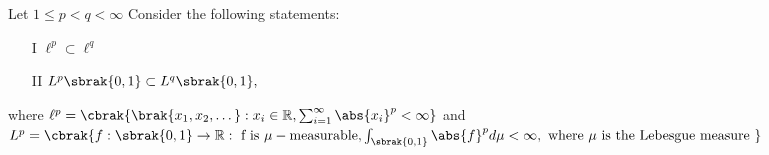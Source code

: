 \bigskip
\item Let $1 \leq p < q < \infty$  Consider the following statements:
\begin{itemize}
    \item [I] $\ell^{p} \subset \ell^{q}$
    \item [II] $L^{p}\sbrak{0,1} \subset L^{q}\sbrak{0,1},$
\end{itemize}
where $\ell^{p} = \cbrak{\brak{x_{1}, x_{2}, \dots} : x_{i} \in \mathbb{R}, \sum_{i=1}^{\infty} \abs{x_i}^{p} < \infty}$ and\\
{\small $L^{p}=\cbrak{f:\sbrak{0,1}\to\mathbb{R}:\text{ f is }\mu-\text{measurable},\int_{\sbrak{0,1}}\abs{f}^{p}d\mu<\infty, \text{ where } \mu \text{ is the Lebesgue measure }}$}\\



